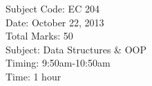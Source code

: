 \documentclass[12pt,addpoints]{exam}
\begin{document}
\begin{center}
\begin{vwcol}[widths={0.5,0.5},rule=none,sidesep=5pt]
\phantom{dss}Subject Code: EC 204\\
Date: October 22, 2013\\
Total Marks: 50\\
Subject: Data Structures \& OOP\\
Timing: 9:50am-10:50am\\
Time: 1 hour 
\end{vwcol}
\end{center}
\vspace{0.1in}


\vspace{0.2in}


\vspace{0.2in}
\end{document}
